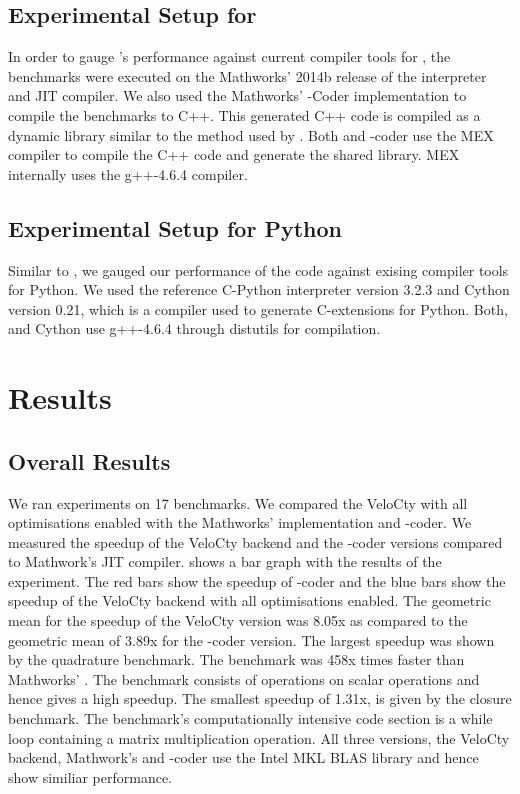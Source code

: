 \subsection{Experimental Setup for \matlab}
 In order to gauge \velocty's performance against current compiler tools for \matlab, the \matlab benchmarks were executed on the Mathworks' 2014b release of the \matlab interpreter and JIT compiler. We also used the Mathworks' \matlab-Coder implementation to compile the benchmarks to C++. This generated C++ code is compiled as  a dynamic library similar to the method used by \velocty. Both \velocty and \matlab-coder use the MEX compiler to compile the C++ code and generate the shared library. MEX internally uses the g++-4.6.4 compiler. 
\subsection{Experimental Setup for Python}
 Similar to \matlab, we gauged our performance of the \velocty code against exising compiler tools for Python. We used the reference C-Python interpreter version 3.2.3  and Cython\cite{cython} version 0.21, which is a compiler used to generate C-extensions for Python. Both, \velocty and Cython use g++-4.6.4 through distutils for compilation. 

\section{\matlab Results}

\subsection{Overall Results}
We ran experiments on 17 \matlab benchmarks. We compared the VeloCty with all optimisations enabled  with the Mathworks' \matlab implementation and \matlab-coder. We measured the speedup of the VeloCty backend and the \matlab-coder versions compared to Mathwork's \matlab JIT compiler.  shows a bar graph with the results of the experiment. The red bars show the speedup of \matlab-coder and the blue bars show the speedup of the VeloCty backend with all optimisations enabled. The geometric mean for the speedup of the VeloCty version was 8.05x as compared to the geometric mean of 3.89x for the \matlab-coder version. The largest speedup was shown by the quadrature benchmark. The benchmark was 458x times faster than Mathworks' \matlab. The benchmark consists of operations on scalar operations and hence gives a high speedup. The smallest speedup of 1.31x, is given by the closure benchmark. The benchmark's computationally intensive code section is a while loop containing a matrix multiplication operation. All three versions, the VeloCty backend, Mathwork's \matlab and \matlab-coder use the Intel MKL BLAS library and hence show similiar performance. 


